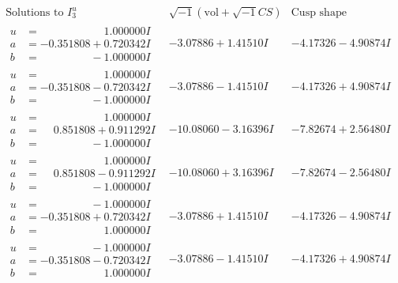 \documentclass[1p]{elsarticle_modified}
\theoremstyle{definition}
\newcommand{\I}{\sqrt{-1}}
\begin{document}
$$\begin{array}{c|c|c}  
\text{Solutions to }I^u_{3}& \I (\text{vol} + \sqrt{-1}CS) & \text{Cusp shape}\\
 \hline 
\begin{aligned}
u &= \phantom{-0.000000 -}1.000000 I \\
a &= -0.351808 + 0.720342 I \\
b &= \phantom{-0.000000 } -1.000000 I\end{aligned}
 & -3.07886 + 1.41510 I & -4.17326 - 4.90874 I \\ \hline\begin{aligned}
u &= \phantom{-0.000000 -}1.000000 I \\
a &= -0.351808 - 0.720342 I \\
b &= \phantom{-0.000000 } -1.000000 I\end{aligned}
 & -3.07886 - 1.41510 I & -4.17326 + 4.90874 I \\ \hline\begin{aligned}
u &= \phantom{-0.000000 -}1.000000 I \\
a &= \phantom{-}0.851808 + 0.911292 I \\
b &= \phantom{-0.000000 } -1.000000 I\end{aligned}
 & -10.08060 - 3.16396 I & -7.82674 + 2.56480 I \\ \hline\begin{aligned}
u &= \phantom{-0.000000 -}1.000000 I \\
a &= \phantom{-}0.851808 - 0.911292 I \\
b &= \phantom{-0.000000 } -1.000000 I\end{aligned}
 & -10.08060 + 3.16396 I & -7.82674 - 2.56480 I \\ \hline\begin{aligned}
u &= \phantom{-0.000000 } -1.000000 I \\
a &= -0.351808 + 0.720342 I \\
b &= \phantom{-0.000000 -}1.000000 I\end{aligned}
 & -3.07886 + 1.41510 I & -4.17326 - 4.90874 I \\ \hline\begin{aligned}
u &= \phantom{-0.000000 } -1.000000 I \\
a &= -0.351808 - 0.720342 I \\
b &= \phantom{-0.000000 -}1.000000 I\end{aligned}
 & -3.07886 - 1.41510 I & -4.17326 + 4.90874 I \\ \hline\begin{aligned}

\end{aligned}
\end{array}$$
\end{document}
